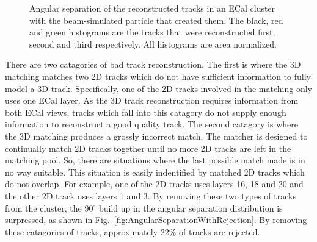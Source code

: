 \begin{figure}%
  \centering
  \caption{Angular separation of the reconstructed tracks in an ECal cluster with the beam-simulated particle that created them.  The black, red and green histograms are the tracks that were reconstructed first, second and third respectively.  All histograms are area normalized.}
  \label{fig:TrackRejectionAngularSeparation}
\end{figure}
There are two catagories of bad track reconstruction.  The first is where the 3D matching matches two 2D tracks which do not have sufficient information to fully model a 3D track.  Specifically, one of the 2D tracks involved in the matching only uses one ECal layer.  As the 3D track reconstruction requires information from both ECal views, tracks which fall into this catagory do not supply enough information to reconstruct a good quality track.  The second catagory is where the 3D matching produces a grossly incorrect match.  The matcher is designed to continually match 2D tracks together until no more 2D tracks are left in the matching pool.  So, there are situations where the last possible match made is in no way suitable.  This situation is easily indentified by matched 2D tracks which do not overlap.  For example, one of the 2D tracks uses layers 16, 18 and 20 and the other 2D track uses layers 1 and 3.  By removing these two types of tracks from the cluster, the 90$^\circ$ build up in the angular separation distribution is surpressed, as shown in Fig.~\ref{fig:AngularSeparationWithRejection}.  By removing these catagories of tracks, approximately 22$\%$ of tracks are rejected.
